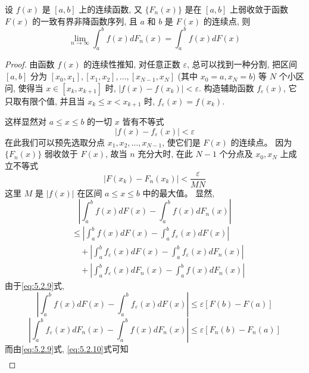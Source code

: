 \begin{theorem}[海莱第二定理]\label{thm:helly_second}
设 $f(x)$ 是 $[a,b]$ 上的连续函数, 又 $\{F_n(x)\}$ 是在 $[a,b]$ 上弱收敛于函数 $F(x)$ 的一致有界非降函数序列, 且 $a$ 和 $b$ 是 $F(x)$ 的连续点, 则
\[
\lim_{n\to\infty} \int_a^b f(x) dF_n(x) = \int_a^b f(x) dF(x)
\]
\end{theorem}
\begin{proof}
由函数 $f(x)$ 的连续性推知, 对任意正数 $\varepsilon$, 总可以找到一种分割, 把区间 $[a, b]$ 分为 $[x_0, x_1], [x_1, x_2], \ldots, [x_{N-1}, x_N]$ (其中 $x_0=a, x_N=b$) 等 $N$ 个小区问, 使得当 $x \in [x_k, x_{k+1}]$ 时, $|f(x) - f(x_k)| < \varepsilon$. 构造辅助函数 $f_\varepsilon(x)$, 它只取有限个值, 并且当 $x_k \le x < x_{k+1}$ 时, $f_\varepsilon(x) = f(x_k)$.

这样显然对 $a \le x \le b$ 的一切 $x$ 皆有不等式
\begin{equation} \label{eq:5.2.9}
|f(x) - f_\varepsilon(x)| < \varepsilon
\end{equation}
在此我们可以预先选取分点 $x_1, x_2, \ldots, x_{N-1}$, 使它们是 $F(x)$ 的连续点。 因为 $\{F_n(x)\}$ 弱收敛于 $F(x)$, 故当 $n$ 充分大时, 在此 $N-1$ 个分点及 $x_0, x_N$ 上成立不等式
\begin{equation} \label{eq:5.2.10}
|F(x_k) - F_n(x_k)| < \frac{\varepsilon}{MN}
\end{equation}
这里 $M$ 是 $|f(x)|$ 在区间 $a \le x \le b$ 中的最大值。 显然,
\[
\left|\int_a^b f(x) dF(x) - \int_a^b f(x) dF_n(x)\right|
\]
\begin{align*}
&\le \left|\int_a^b f(x) dF(x) - \int_a^b f_\varepsilon(x) dF(x)\right| \\
&\quad + \left|\int_a^b f_\varepsilon(x) dF(x) - \int_a^b f_\varepsilon(x) dF_n(x)\right| \\
&\quad + \left|\int_a^b f_\varepsilon(x) dF_n(x) - \int_a^b f(x) dF_n(x)\right| \label{eq:5.2.11} %
\end{align*}
由于\eqref{eq:5.2.9}式,
\begin{equation} \label{eq:5.2.12}
\left|\int_a^b f(x) dF(x) - \int_a^b f_\varepsilon(x) dF(x)\right| \le \varepsilon [F(b) - F(a)]
\end{equation}
\begin{equation} \label{eq:5.2.13}
\left|\int_a^b f_\varepsilon(x) dF_n(x) - \int_a^b f(x) dF_n(x)\right| \le \varepsilon [F_n(b) - F_n(a)]
\end{equation}
而由\eqref{eq:5.2.9}式, \eqref{eq:5.2.10}式可知
\begin{align}

\end{align}
\end{proof}
